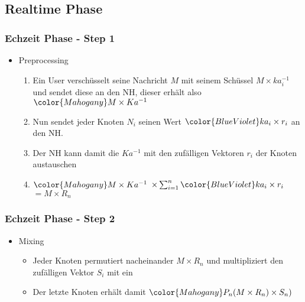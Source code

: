 \documentclass[t, xcolor=dvipsnames]{beamer}
\begin{document}
\subsection{Realtime Phase} %
\begin{frame}
	\frametitle{Echzeit Phase - Step 1}
	\begin{itemize}
		\item Preprocessing
		\begin{enumerate}
		\item Ein User verschüsselt seine Nachricht $M$ mit seinem Schüssel $M \times ka_i^{-1}$ und sendet diese an den NH, dieser erhält also $\color{Mahogany}M \times Ka^{-1}$
		\item Nun sendet jeder Knoten $N_i$ seinen Wert $\color{BlueViolet}ka_i \times r_i$ an den NH.
		\item Der NH kann damit die $Ka^{-1}$ mit den zufälligen Vektoren $r_i$ der Knoten austauschen
		\item $ \color{Mahogany} M \times Ka^{-1}$ $\times \sum_{i=1}^n \color{BlueViolet}ka_i \times r_i$ $= M \times R_n$

		\end{enumerate}

		
	\end{itemize}
	\vspace{\fill}
\end{frame}

\begin{frame}
	\frametitle{Echzeit Phase - Step 2}
	\begin{itemize}
		\item Mixing
		\begin{itemize}
			\item Jeder Knoten permutiert nacheinander $M \times R_n$ und multipliziert den zufälligen Vektor $S_i$ mit ein
			\item Der letzte Knoten erhält damit $\color{Mahogany}P_n(M \times R_n) \times S_n)$
		\end{itemize}
	\end{itemize}
	\vspace{\fill}
\end{frame}
\end{document}
